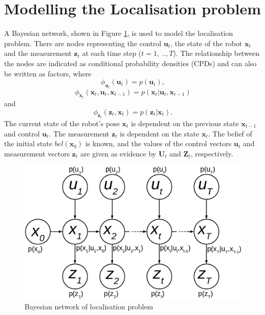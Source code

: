 \documentclass[12pt,oneside,openany,a4paper, %
afrikaans,english,
]{memoir}
\numberwithin{equation}{chapter}
\begin{document}
\section{Modelling the Localisation problem}\label{sec:model}
A Bayesian network, shown in Figure \ref{fig:loc_bayes}, is used to model the localisation problem. There are nodes representing the control $\bm{u}_t$, the state of the robot $\bm{x}_t$ and the measurement $\bm{z}_t$ at each time step ($t = 1,\ ..,T$). The relationship between the nodes are indicated as conditional probability densities (CPDs) and can also be written as factors, where
\begin{equation}
\phi_{\bm{u}_t}(\bm{u}_t) = p(\bm{u}_t),
\end{equation}
\begin{equation}
\phi_{\bm{x}_t}(\bm{x}_t, \bm{u}_t, \bm{x}_{t-1}) = p(\bm{x}_t| \bm{u}_t, \bm{x}_{t-1}) 
\end{equation}
and
\begin{equation}
\phi_{\bm{z}_t}(\bm{z}_t, \bm{x}_t) = p(\bm{z}_t|\bm{x}_t). 
\end{equation}
The current state of the robot's pose $\bm{x}_t$ is dependent on the previous state $\bm{x}_{t-1}$ and control $\bm{u}_t$. The measurement $\bm{z}_t$ is dependent on the state $\bm{x}_t$. The belief of the initial state $bel(\bm{x}_0)$ is known, and the values of the control vectors $\bm{u}_t$ and measurement vectors $\bm{z}_t$ are given as evidence by $\bm{U}_t$ and $\bm{Z}_t$, respectively.

\begin{figure}
  \includegraphics[width=0.7\linewidth]{Figures/bayesnetloc.png}
  \centering
  \caption{Bayesian network of localisation problem}
  \label{fig:loc_bayes}
\end{figure}
\end{document}
